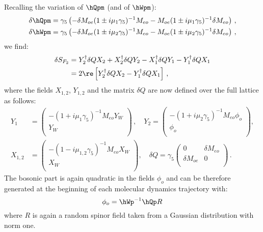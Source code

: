 Recalling the variation of $\hQpm$ (and of $\hWpm$):
\begin{equation}
  \label{eq:mt5}
  \begin{split}
    \delta\hQpm &= \gamma_5\left(-\delta M_{oe}(1\pm i\mu_1\gamma_5 )^{-1}M_{eo} -
      M_{oe}(1\pm i\mu_1\gamma_5 )^{-1}\delta M_{eo}\right)\, , \\
    \delta\hWpm &= \gamma_5\left(-\delta M_{oe}(1\pm i\mu_2\gamma_5 )^{-1}M_{eo} -
      M_{oe}(1\pm i\mu_2\gamma_5)^{-1}\delta M_{eo}\right)\, ,
  \end{split}
\end{equation}
we find:
\begin{equation}
  \label{eq:mt6}
  \begin{split}
    \delta S_{F_2} &= Y_2^\dagger \delta Q X_2 + X_2^\dagger\delta QY_2 -X_1^\dagger\delta Q Y_1 -
    Y_1^\dagger\delta Q X_1\\
    &= 2\re\left[Y_2^\dagger \delta Q X_2 - Y_1^\dagger\delta Q X_1 \right]\, ,
  \end{split}
\end{equation}
where the fields $X_{1,2}$, $Y_{1,2}$ and the matrix $\delta Q$ are now
defined over the full lattice as follows:
\begin{equation}
  \label{eq:mt7}
  \begin{split}
    Y_1 &= 
    \begin{pmatrix}
      -(1+i\mu_{1}\gamma_5)^{-1}M_{eo}Y_W \\ Y_W\\
    \end{pmatrix}\, ,\quad
    Y_2 = 
    \begin{pmatrix}
      -(1+i\mu_{2}\gamma_5)^{-1}M_{eo}\phi_o \\ \phi_o\\
    \end{pmatrix},\\
    X_{1,2} &= 
    \begin{pmatrix}
      -(1-i\mu_{1,2}\gamma_5)^{-1}M_{eo}X_W \\ X_W\\
    \end{pmatrix},\quad
    \delta Q = \gamma_5
    \begin{pmatrix}
      0 & \delta M_{eo}\\
      \delta M_{oe} & 0\\
    \end{pmatrix}\, .
  \end{split}
\end{equation}
The bosonic part is again quadratic in the fields $\phi_o$ and can be
therefore generated at the beginning of each molecular dynamics
trajectory with:
\begin{equation}
  \label{eq:mt8}
  \phi_o = \hWp^{-1}\hQp R
\end{equation}
where $R$ is again a random spinor field taken from a Gaussian
distribution with norm one.

